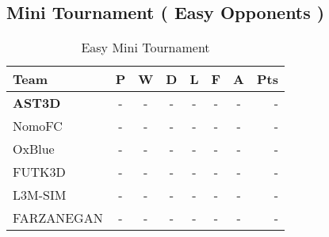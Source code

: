\subsection{Mini Tournament ( Easy Opponents )}

\begin{table}
\begin{center}
\begin{tabular}{l*{6}{c}r}
Team              & P & W & D & L & F  & A & Pts \\ \hline
\textbf{AST3D} & - & - & - & - & - & - & -  \\
NomoFC            & - & - & - & - &  - & - &  -  \\
OxBlue           & - & - & - & - &  - & - &  -  \\
FUTK3D     & - & - & - & - &  - & - &  - \\
L3M-SIM     & - & - & - & - &  - & - &  - \\
FARZANEGAN     & - & - & - & - &  - & - &  - \\
\end{tabular}
\end{center}
\label{EasyTournament}
\caption{Easy Mini Tournament}
\end{table}